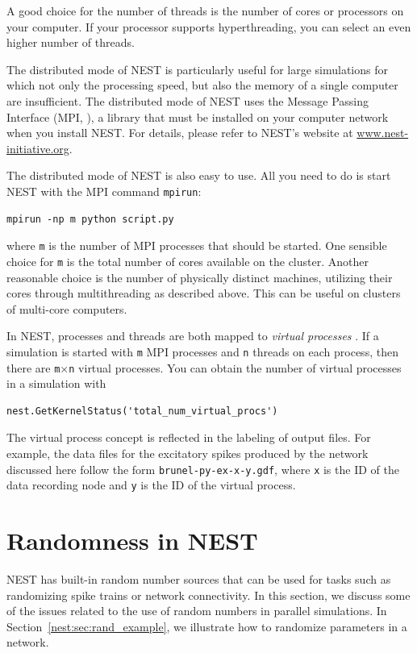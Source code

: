 \documentclass{article}
\begin{document}
A good choice for the number of threads is the number of cores or
processors on your computer. If your processor supports
hyperthreading, you can select an even higher number of threads.

The distributed mode of NEST is particularly useful for large simulations
for which not only the processing speed, but also the memory of a single
computer are insufficient.  The distributed mode of NEST uses the
Message Passing Interface (MPI, \citet{MPI2009}), a library that must be
installed on your computer network when you install NEST. For details,
please refer to NEST's website at \url{www.nest-initiative.org}.

The distributed mode of NEST is also easy to use. All you need to do
is start NEST with the MPI command \lstinline!mpirun!:
\begin{lstlisting}[numbers=none]
mpirun -np m python script.py
\end{lstlisting}
where \lstinline!m! is the number of MPI processes that should be
started. One sensible choice for \lstinline!m! is the total number of
cores available on the cluster. Another reasonable choice is the
number of physically distinct machines, utilizing their cores through
multithreading as described above. This can be useful on clusters of
multi-core computers. 

In NEST, processes and threads are both mapped to \emph{virtual
  processes} \citep{Ples:2007(672)}. If a
simulation is started with \lstinline!m! MPI processes and
\lstinline!n!  threads on each process, then there are
\lstinline!m!$\times$\lstinline!n!  virtual processes. You can obtain
the number of virtual processes in a simulation with
\begin{lstlisting}[numbers=none]
nest.GetKernelStatus('total_num_virtual_procs')
\end{lstlisting}

The virtual process concept is reflected in the labeling of output
files. For example, the data files for the excitatory spikes produced
by the network discussed here follow the form
\lstinline!brunel-py-ex-x-y.gdf!, where \lstinline!x! is the ID of the
data recording node and \lstinline!y! is the ID of the virtual
process.

\section{Randomness in NEST}\label{nest:sec:random}

NEST has built-in random number sources that can be used for tasks
such as randomizing spike trains or network connectivity. In this
section, we discuss some of the issues related to the use of random
numbers in parallel simulations. In
Section~\ref{nest:sec:rand_example}, we illustrate how to randomize
parameters in a network.
\end{document}
